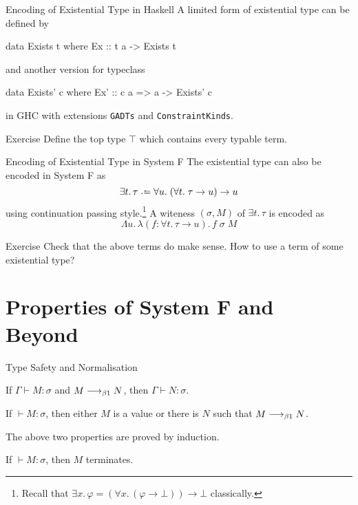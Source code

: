 \begin{frame}[fragile]{Encoding of Existential Type in Haskell}
  A limited form of existential type can be defined by 
  \begin{semiverbatim}
    data Exists t where
      Ex :: t a -> Exists t
  \end{semiverbatim}
  and another version for typeclass
  \begin{semiverbatim}
    data Exists' c where
      Ex' :: c a => a -> Exists' c
  \end{semiverbatim}
  in GHC with extensions \texttt{GADTs} and \texttt{ConstraintKinds}. 

  \begin{block}{Exercise}
    Define the top type $\top$ which contains every typable term.
  \end{block}
\end{frame}

\begin{frame}{Encoding of Existential Type in System F}
  The existential type can also be encoded in System F as 
  \[
    \exists t.\, \tau \defeq \forall u.\; (\forall t.\; \tau \to u) \to u
  \]
  using continuation passing style.\footnote{Recall that $\exists x.\,\varphi
  = (\forall x.\, (\varphi \to \bot)) \to \bot$ classically.  }
  A witeness $(\sigma, M)$ of $\exists t.\, \tau$ is encoded as
  \[
    \Lambda u.\,\lambda (f : \forall t.\, \tau \to u).\, f\;\sigma\;M
  \]

  \begin{block}{Exercise}
    Check that the above terms do make sense. How to use a term of some existential
    type? 
  \end{block}
  
\end{frame}
\section{Properties of System F and Beyond}
\begin{frame}{Type Safety and Normalisation}
  \begin{theorem}[Preservation]
    If $\Gamma \vdash M : \sigma$ 
    and $M \longrightarrow_{\beta1} N$, then
    $\Gamma \vdash N : \sigma$. 
  \end{theorem}

  \begin{theorem}[Progress]
    If ${}\vdash M : \sigma$, then either $M$ is a value or
    there is $N$ such that $M \longrightarrow_{\beta1} N$. 
  \end{theorem}
  The above two properties are proved by induction.

  \begin{theorem}
    If $\vdash M : \sigma$, then $M$ terminates. 
  \end{theorem}
\end{frame}

